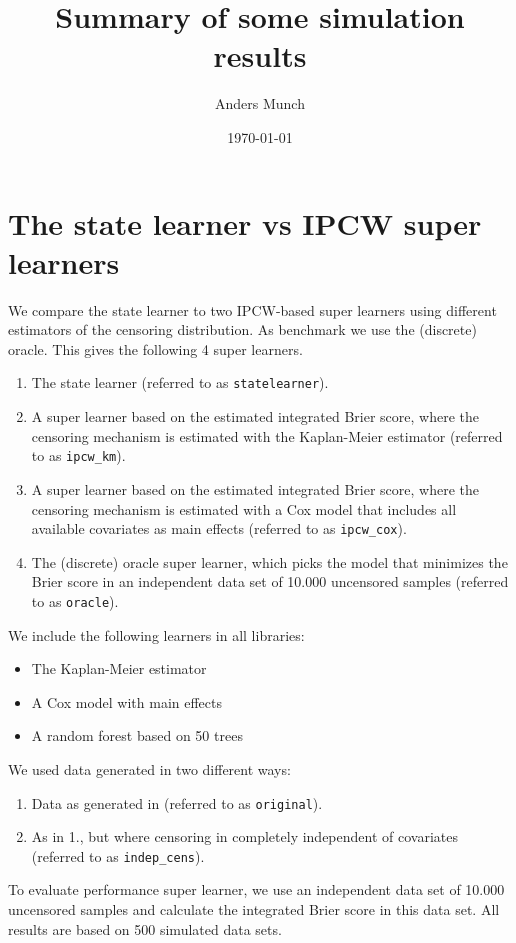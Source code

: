 \documentclass[a4paper,danish]{article}
\author{Anders Munch}
\date{\today}
\title{Summary of some simulation results}
\begin{document}
\maketitle
\section{The state learner vs IPCW super learners}
\label{sec:org8bdf483}

We compare the state learner to two IPCW-based super learners using different
estimators of the censoring distribution. As benchmark we use the (discrete)
oracle. This gives the following 4 super learners.


\begin{enumerate}
\item The state learner (referred to as \texttt{statelearner}).
\item A super learner based on the estimated integrated Brier score, where the
censoring mechanism is estimated with the Kaplan-Meier estimator (referred to
as \texttt{ipcw\_km}).
\item A super learner based on the estimated integrated Brier score, where the
censoring mechanism is estimated with a Cox model that includes all available
covariates as main effects (referred to as \texttt{ipcw\_cox}).
\item The (discrete) oracle super learner, which picks the model that minimizes the
Brier score in an independent data set of 10.000 uncensored samples (referred to
as \texttt{oracle}).
\end{enumerate}

We include the following learners in all libraries:
\begin{itemize}
\item The Kaplan-Meier estimator
\item A Cox model with main effects
\item A random forest based on 50 trees
\end{itemize}

We used data generated in two different ways:
\begin{enumerate}
\item Data as generated in \citep{gerds2013estimating} (referred to as \texttt{original}).
\item As in 1., but where censoring in completely independent of covariates
(referred to as \texttt{indep\_cens}).
\end{enumerate}

To evaluate performance super learner, we use an independent data set of 10.000
uncensored samples and calculate the integrated Brier score in this data set.
All results are based on 500 simulated data sets.
\end{document}
